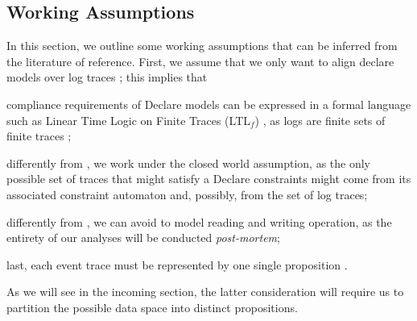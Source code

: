 \subsection{Working Assumptions}\label{sec:wa}
In this section, we outline some working assumptions that can be inferred from the literature of reference. First, we assume that we only want to align declare models over  log traces \cite{XuLZ17a}; this implies that \begin{enumerate*}[label=\emph{\alph*})] \item compliance requirements of Declare models can be expressed in a formal language such as Linear Time Logic on Finite Traces (LTL$_f$) \cite{10.1007/978-3-642-40176-3_8}, as logs are finite sets of finite traces \cite{GiacomoV13}; \item differently from \cite{BurattinMS16,MaggiMB19}, we work under the closed world assumption, as the only possible set of traces that might satisfy a Declare constraints might come from its associated constraint automaton and, possibly, from the set of log traces; \item differently from \cite{MultiPerspective}, we can avoid to model reading and writing operation, as the entirety of our analyses will be conducted \textit{post-mortem}; \item last, each event trace must be represented by one single proposition \cite{XuLZ17a}. \end{enumerate*} As we will see in the incoming section, the latter consideration will require us to partition the possible data space into distinct propositions. 





